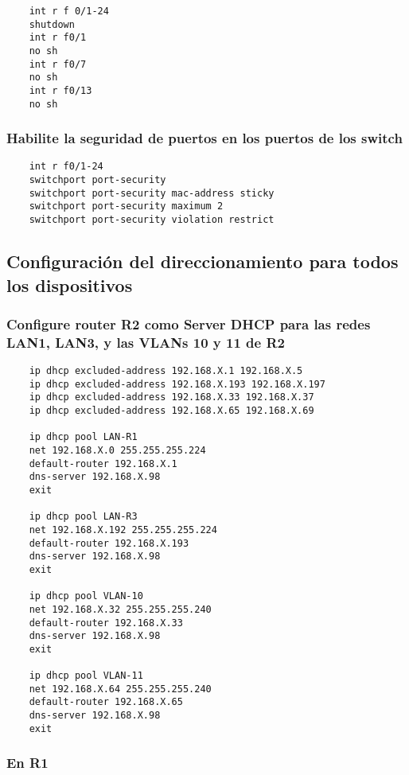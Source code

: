 \documentclass[twocolumn]{article}
\begin{document}
    \begin{verbatim}
    int r f 0/1-24
    shutdown
    int r f0/1
    no sh
    int r f0/7
    no sh
    int r f0/13
    no sh
    \end{verbatim}
    
    \subsubsection*{Habilite la seguridad de puertos en los puertos de los switch}
    
    \begin{verbatim}
    int r f0/1-24
    switchport port-security
    switchport port-security mac-address sticky
    switchport port-security maximum 2
    switchport port-security violation restrict
    \end{verbatim}
    
    \subsection*{Configuración del direccionamiento para todos los dispositivos}
    
    \subsubsection*{Configure router R2 como Server DHCP para las redes LAN1, LAN3, y las VLANs 10 y 11 de R2}
    
    \begin{verbatim}
    ip dhcp excluded-address 192.168.X.1 192.168.X.5
    ip dhcp excluded-address 192.168.X.193 192.168.X.197
    ip dhcp excluded-address 192.168.X.33 192.168.X.37
    ip dhcp excluded-address 192.168.X.65 192.168.X.69
    
    ip dhcp pool LAN-R1
    net 192.168.X.0 255.255.255.224
    default-router 192.168.X.1
    dns-server 192.168.X.98
    exit
    
    ip dhcp pool LAN-R3
    net 192.168.X.192 255.255.255.224
    default-router 192.168.X.193
    dns-server 192.168.X.98
    exit
    
    ip dhcp pool VLAN-10
    net 192.168.X.32 255.255.255.240
    default-router 192.168.X.33
    dns-server 192.168.X.98
    exit
    
    ip dhcp pool VLAN-11
    net 192.168.X.64 255.255.255.240
    default-router 192.168.X.65
    dns-server 192.168.X.98
    exit
    \end{verbatim}
    
    \subsubsection*{En R1}
    
\end{document}
